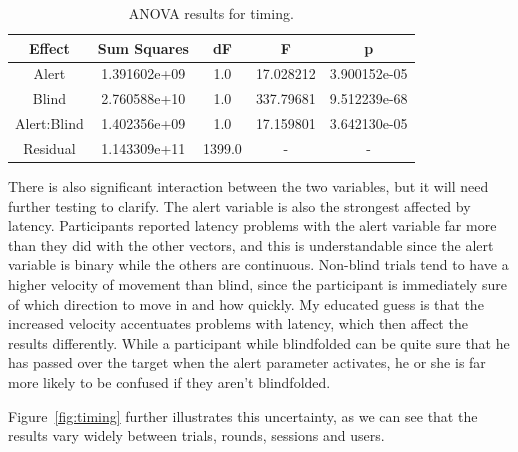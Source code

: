 \documentclass[
12pt, %
oneside, %
english, %
doublespacing, %
headsepline, %
]{MastersDoctoralThesis} %
\begin{document}
\begin{table}
	\centering
	\begin{tabular}{c|cccc}
		\toprule
		Effect & Sum Squares & dF & F & p\\
		\midrule
		Alert & 1.391602e+09 & 1.0 & 17.028212 & 3.900152e-05\\
		Blind & 2.760588e+10 & 1.0 & 337.79681 & 9.512239e-68\\
		Alert:Blind & 1.402356e+09 & 1.0 & 17.159801 & 3.642130e-05\\
		Residual & 1.143309e+11 & 1399.0 & - & -\\
		\bottomrule
	\end{tabular}
	\caption[Phase 1 Timing ANOVA]{ANOVA results for timing.}
	\label{tab:p2timinganova}
\end{table}

There is also significant interaction between the two variables, but it will need further testing to clarify. The alert variable is also the strongest affected by latency. Participants reported latency problems with the alert variable far more than they did with the other vectors, and this is understandable since the alert variable is binary while the others are continuous. Non-blind trials tend to have a higher velocity of movement than blind, since the participant is immediately sure of which direction to move in and how quickly. My educated guess is that the increased velocity accentuates problems with latency, which then affect the results differently. While a participant while blindfolded can be quite sure that he has passed over the target when the alert parameter activates, he or she is far more likely to be confused if they aren't blindfolded.

Figure~\ref{fig:timing} further illustrates this uncertainty, as we can see that the results vary widely between trials, rounds, sessions and users.
\end{document}
